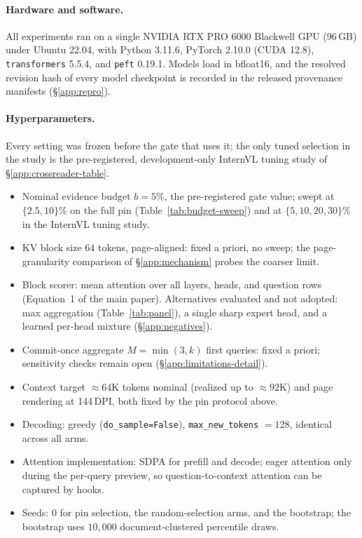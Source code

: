 \documentclass[letterpaper]{article} %
\begin{document}
\paragraph{Hardware and software.} All experiments ran on a single NVIDIA
RTX PRO 6000 Blackwell GPU (96\,GB) under Ubuntu 22.04, with Python 3.11.6,
PyTorch 2.10.0 (CUDA 12.8), \texttt{transformers} 5.5.4, and \texttt{peft}
0.19.1. Models load in bfloat16, and the resolved revision hash of every
model checkpoint is recorded in the released provenance manifests
(\S\ref{app:repro}).

\paragraph{Hyperparameters.} Every setting was frozen before the gate that
uses it; the only tuned selection in the study is the pre-registered,
development-only InternVL tuning study of \S\ref{app:crossreader-table}.
\begin{itemize}\setlength{\itemsep}{.1em}
\item Nominal evidence budget $b=5\%$, the pre-registered gate value; swept
at $\{2.5, 10\}\%$ on the full pin (Table~\ref{tab:budget-sweep}) and at
$\{5,10,20,30\}\%$ in the InternVL tuning study.
\item KV block size $64$ tokens, page-aligned: fixed a priori, no sweep; the
page-granularity comparison of \S\ref{app:mechanism} probes the coarser
limit.
\item Block scorer: mean attention over all layers, heads, and question rows
(Equation~1 of the main paper). Alternatives evaluated and not adopted: max
aggregation (Table~\ref{tab:panel}), a single sharp expert head, and a
learned per-head mixture (\S\ref{app:negatives}).
\item Commit-once aggregate $M=\min(3,k)$ first queries: fixed a priori;
sensitivity checks remain open (\S\ref{app:limitations-detail}).
\item Context target ${\approx}64$K tokens nominal (realized up to
${\approx}92$K) and page rendering at 144\,DPI, both fixed by the pin
protocol above.
\item Decoding: greedy (\texttt{do\_sample=False}),
\texttt{max\_new\_tokens} $=128$, identical across all arms.
\item Attention implementation: SDPA for prefill and decode; eager attention
only during the per-query preview, so question-to-context attention can be
captured by hooks.
\item Seeds: $0$ for pin selection, the random-selection arms, and the
bootstrap; the bootstrap uses $10{,}000$ document-clustered percentile
draws.
\end{itemize}
\end{document}
